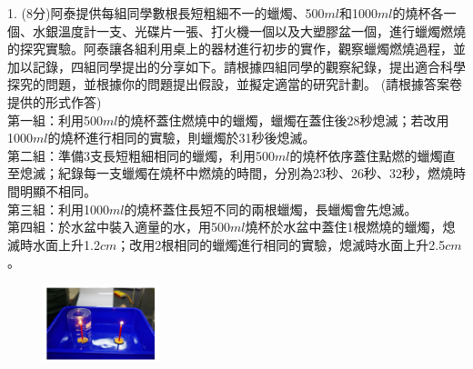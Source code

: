 \documentclass[cn,10pt,math=newtx,chinesefont=founder,device=ig]{elegantbook}
\begin{document}
\begin{example}
   1. (8分)阿泰提供每組同學數根長短粗細不一的蠟燭、500$ml$和1000$ml$的燒杯各一個、水銀溫度計一支、光碟片一張、打火機一個以及大塑膠盆一個，進行蠟燭燃燒的探究實驗。阿泰讓各組利用桌上的器材進行初步的實作，觀察蠟燭燃燒過程，並加以記錄，四組同學提出的分享如下。請根據四組同學的觀察紀錄，提出適合科學探究的問題，並根據你的問題提出假設，並擬定適當的研究計劃。 (請根據答案卷提供的形式作答)\\
   第一組：利用500$ml$的燒杯蓋住燃燒中的蠟燭，蠟燭在蓋住後28秒熄滅；若改用1000$ml$的燒杯進行相同的實驗，則蠟燭於31秒後熄滅。\\
   第二組：準備3支長短粗細相同的蠟燭，利用500$ml$的燒杯依序蓋住點燃的蠟燭直至熄滅；紀錄每一支蠟燭在燒杯中燃燒的時間，分別為23秒、26秒、32秒，燃燒時間明顯不相同。\\
   第三組：利用1000$ml$的燒杯蓋住長短不同的兩根蠟燭，長蠟燭會先熄滅。\\
   第四組：於水盆中裝入適量的水，用500$ml$燒杯於水盆中蓋住1根燃燒的蠟燭，熄滅時水面上升1.2$cm$；改用2根相同的蠟燭進行相同的實驗，熄滅時水面上升2.5$cm$。\\
    \rightline{[中壢高中教甄109]}
\end{example}
\begin{solution}
    
\end{solution}
\begin{figure}[htbp]
    \flushright
    \includegraphics[width=0.3\textwidth]{image/109中壢221.png}
  \end{figure}
\newpage
\end{document}
